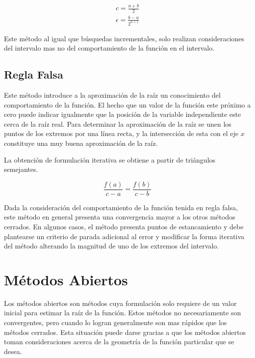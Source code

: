 \documentclass[letterpaper,10pt,oneside]{sphinxmanual}
\theoremstyle{plain}%
\theoremstyle{definition}%
\theoremstyle{remark}%
\begin{document}
\begin{eqnarray}
 c=\frac{a+b}{2} \label{bis}\\
 \epsilon = \frac{b-a}{2^{n+1}} \nonumber
\end{eqnarray}

\noindent Este método al igual que búsquedas incrementales, solo realizan consideraciones del intervalo mas no del comportamiento de la función en el intervalo.\medskip

\subsection{Regla Falsa}
Este método introduce a la aproximación de la raíz un conocimiento del comportamiento de la función. El hecho que un valor de la función este próximo a cero puede indicar igualmente que la posición de la variable independiente este cerca de la raíz real. Para determinar la aproximación de la raíz se unen los puntos de los extremos por una línea recta, y la intersección de esta con el eje $x$ constituye una muy buena aproximación de la raíz.\medskip

\noindent La obtención de formulación iterativa se obtiene a partir de triángulos semejantes.\medskip

\begin{equation}
\frac{f(a)}{c-a}=\frac{f(b)}{c-b} \label{regfal}
\end{equation}

\noindent Dada la consideración del comportamiento de la función tenida en regla falsa, este método en general presenta una convergencia mayor a los otros métodos cerrados. En algunos casos, el método presenta puntos de estancamiento y debe plantearse un criterio de parada adicional al error y modificar la forma iterativa del método alterando la magnitud de uno de los extremos del intervalo.\medskip

\section{Métodos Abiertos}
\label{chapter02:Métodos Abiertos}

\noindent Los métodos abiertos son métodos cuya formulación solo requiere de un valor inicial para estimar la raíz de la función. Estos métodos no necesariamente son convergentes, pero cuando lo logran generalmente son mas rápidos que los métodos cerrados. Esta situación puede darse gracias a que los métodos abiertos toman consideraciones acerca de la geometría de la función particular que se desea.\medskip
\end{document}
